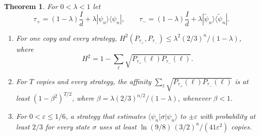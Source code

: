 \documentclass[11pt]{article}
\newtheorem{theorem}{Theorem}
\theoremstyle{remark}
\newcommand{\eps}{\varepsilon}
\newcommand{\ket}[1]{|#1\rangle}
\newcommand{\bra}[1]{\langle #1|}
\begin{document}
\begin{theorem}\label{thm:low}
For $0<\lambda<1$ let
\[
\tau_+ = (1-\lambda)\frac Id + \lambda\ket{\psi_n}\bra{\psi_n},\qquad \tau_- = (1-\lambda)\frac Id + \lambda\ket{\tilde\psi_n}\bra{\tilde\psi_n}.
\]
\begin{enumerate}
\item[(a)] For one copy and every strategy, $H^2(P_{\tau_+}, P_{\tau_-}) \le \lambda^2(2/3)^n/(1-\lambda)$, where
\[H^2 = 1-\sum_\ell\sqrt{P_{\tau_+}(\ell)P_{\tau_-}(\ell)}.\]
\item[(b)] For $T$ copies and every strategy, the affinity $\sum_\ell \sqrt{P_{\tau_+}(\ell)P_{\tau_-}(\ell)}$ is at least $(1-\beta^2)^{T/2}$, where $\beta = \lambda(2/3)^{n/2}/(1-\lambda)$, whenever $\beta<1$.
\item[(c)] For $0<\eps\le1/6$, a strategy that estimates $\bra{\psi_n}\sigma\ket{\psi_n}$ to $\pm\eps$ with probability at least $2/3$ for every state $\sigma$ uses at least $\ln(9/8)\,(3/2)^n/(41\eps^2)$ copies.
\end{enumerate}
\end{theorem}
\end{document}
